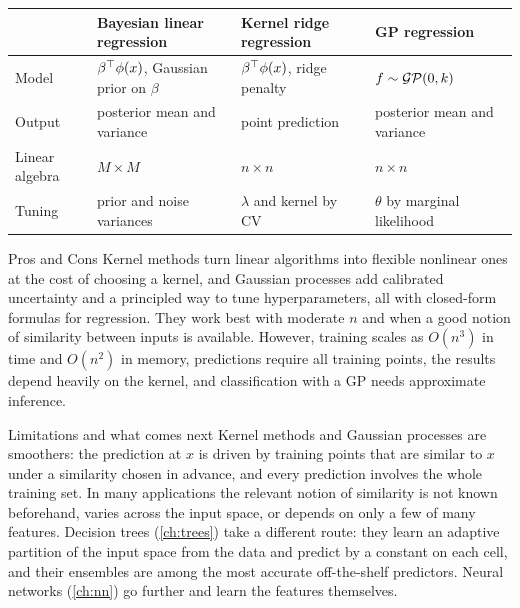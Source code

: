 \begin{center}
\small
\begin{tabularx}{\textwidth}{@{}l>{\raggedright\arraybackslash}X>{\raggedright\arraybackslash}X>{\raggedright\arraybackslash}X@{}}
\toprule
 & Bayesian linear regression & Kernel ridge regression & GP regression \\
\midrule
Model & $\beta^{\top}\phi(x)$, Gaussian prior on $\beta$ & $\beta^{\top}\phi(x)$, ridge penalty & $f\sim\mathcal{GP}(0,k)$ \\
Output & posterior mean and variance & point prediction & posterior mean and variance \\
Linear algebra & $M\times M$ & $n\times n$ & $n\times n$ \\
Tuning & prior and noise variances & $\lambda$ and kernel by CV & $\theta$ by marginal likelihood \\
\bottomrule
\end{tabularx}
\end{center}

\begin{notebox}{Pros and Cons}
Kernel methods turn linear algorithms into flexible nonlinear ones at the cost of choosing a kernel, and Gaussian processes add calibrated uncertainty and a principled way to tune hyperparameters, all with closed-form formulas for regression. They work best with moderate $n$ and when a good notion of similarity between inputs is available. However, training scales as $O(n^3)$ in time and $O(n^2)$ in memory, predictions require all training points, the results depend heavily on the kernel, and classification with a GP needs approximate inference.
\end{notebox}

\begin{notebox}{Limitations and what comes next}
Kernel methods and Gaussian processes are smoothers: the prediction at $x$ is driven by training points that are similar to $x$ under a similarity chosen in advance, and every prediction involves the whole training set. In many applications the relevant notion of similarity is not known beforehand, varies across the input space, or depends on only a few of many features. Decision trees (\cref{ch:trees}) take a different route: they learn an adaptive partition of the input space from the data and predict by a constant on each cell, and their ensembles are among the most accurate off-the-shelf predictors. Neural networks (\cref{ch:nn}) go further and learn the features themselves.
\end{notebox}
